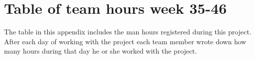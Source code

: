 \chapter{Table of team hours week 35-46}
\label{app:team-hours}
The table in this appendix includes the man hours registered during this project. After each day of working with the project each team member wrote down how many hours during that day he or she worked with the project.



